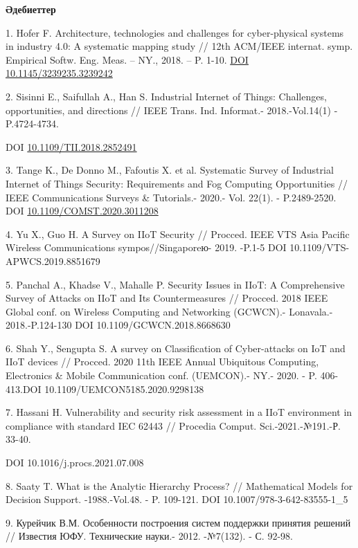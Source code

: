 \begin{center}
{\bfseries Әдебиеттер}
\end{center}

\begin{references}
1. Hofer F. Architecture, technologies and challenges for cyber-physical
systems in industry 4.0: A systematic mapping study // 12th ACM/IEEE
internat. symp. Empirical Softw. Eng. Meas. -- NY., 2018. -- P. 1-10.
\href{https://doi.org/10.1145/3239235.3239242}{DOI
10.1145/3239235.3239242}

2. Sisinni E., Saifullah A., Han S. Industrial Internet of Things:
Challenges, opportunities, and directions // IEEE Trans. Ind. Informat.-
2018.-Vol.14(1) - P.4724-4734.

DOI
\href{https://doi.org/10.1109/TII.2018.2852491}{10.1109/TII.2018.2852491}

3. Tange K., De Donno M., Fafoutis X. et al. Systematic Survey of
Industrial Internet of Things Security: Requirements and Fog Computing
Opportunities // IEEE Communications Surveys \& Tutorials.- 2020.- Vol.
22(1). - P.2489-2520. DOI
\href{http://dx.doi.org/10.1109/COMST.2020.3011208}{10.1109/COMST.2020.3011208}

4. Yu X., Guo H. A Survey on IIoT Security // Procced. IEEE VTS Asia
Pacific Wireless Communications sympos//Singaporeю- 2019. -P.1-5 DOI
10.1109/VTS-APWCS.2019.8851679

5. Panchal A., Khadse V., Mahalle P. Security Issues in IIoT: A
Comprehensive Survey of Attacks on IIoT and Its Countermeasures //
Procced. 2018 IEEE Global conf. on Wireless Computing and Networking
(GCWCN).- Lonavala.- 2018.-P.124-130 DOI 10.1109/GCWCN.2018.8668630

6. Shah Y., Sengupta S. A survey on Classification of Cyber-attacks on
IoT and IIoT devices // Procced. 2020 11th IEEE Annual Ubiquitous
Computing, Electronics \& Mobile Communication conf. (UEMCON).- NY.-
2020. - P. 406-413.DOI 10.1109/UEMCON5185.2020.9298138

7. Hassani H. Vulnerability and security risk assessment in a IIoT
environment in compliance with standard IEC 62443 // Procedia Comput.
Sci.-2021.-№191.-Р. 33-40.

DOI 10.1016/j.procs.2021.07.008

8. Saaty T. What is the Analytic Hierarchy Process? // Mathematical
Models for Decision Support. -1988.-Vol.48. - P. 109-121. DOI
10.1007/978-3-642-83555-1\_5

9. Курейчик В.М. Особенности построения систем поддержки принятия
решений // Известия ЮФУ. Технические науки.- 2012. -№7(132). - С. 92-98.


\end{references}
